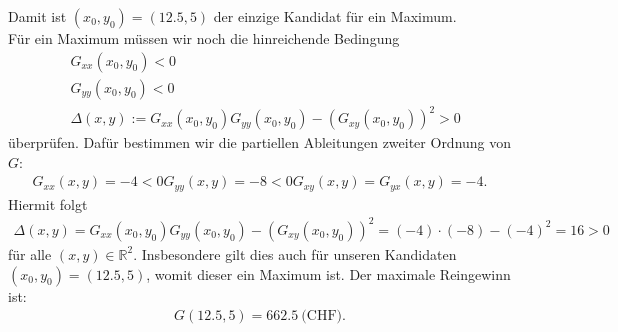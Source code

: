Damit ist $ (x_0,y_0 ) = (12.5, 5) $ der einzige Kandidat für ein Maximum.\\
Für ein Maximum müssen wir noch die hinreichende Bedingung 
\begin{align*}
	&G_{xx}(x_0,y_0) < 0 \\
	&G_{yy}(x_0,y_0) < 0\\
	&\Delta(x,y) := G_{xx}(x_0,y_0)G_{yy}(x_0,y_0)-(G_{xy}(x_0,y_0))^2 > 0
\end{align*}
überprüfen. Dafür bestimmen wir die partiellen Ableitungen zweiter Ordnung von $ G $:
\begin{align*}
	G_{xx}(x,y) = -4 < 0
	G_{yy}(x,y) = -8 < 0
	G_{xy}(x,y) = G_{yx}(x,y) = -4.
\end{align*}
Hiermit folgt
\begin{align*}
	\Delta(x,y) = G_{xx}(x_0,y_0)G_{yy}(x_0,y_0)-(G_{xy}(x_0,y_0))^2
	= (-4)\cdot(-8) - (-4)^2 = 16  >0
\end{align*}
für alle $ (x,y) \in \mathbb{R}^2 $. Insbesondere gilt dies auch für unseren Kandidaten $ (x_0,y_0) = (12.5,5) $, womit dieser ein Maximum ist. Der maximale Reingewinn ist:
\begin{align*}
	G(12.5,5) = 662.5 \ \textrm{(CHF)}.
\end{align*} 





\newpage

